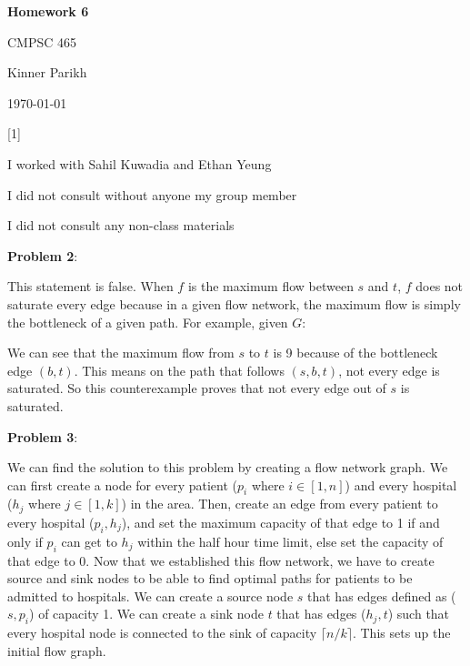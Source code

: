 \documentclass{article} %
\newcommand{\question}[2][]{\begin{flushleft}
        \textbf{Problem #1}: \textit{#2}

\end{flushleft}}
\newcommand{\maketitletwo}[2][]{\begin{center}
        \Large{\textbf{Homework #1}
            
            CMPSC 465} %
        \vspace{5pt}
        
        \normalsize{Kinner Parikh  %
        
        \today}        %
        \vspace{40pt}


        \newpage
        
\end{center}}
\begin{document}
    \maketitletwo[6]  %

    \question[1]{}
    \begin{center}
        
        I worked with Sahil Kuwadia and Ethan Yeung
    
        I did not consult without anyone my group member
    
        I did not consult any non-class materials
    \end{center}
    
    \newpage

    \question[2]{}

    This statement is false. When $f$ is the maximum flow between $s$ and $t$, $f$ does not saturate every edge because in a given flow network, the maximum flow is simply the bottleneck of a given path. For example, given $G$:


    We can see that the maximum flow from $s$ to $t$ is 9 because of the bottleneck edge $(b, t)$. This means on the path that follows $(s, b, t)$, not every edge is saturated. So this counterexample proves that not every edge out of $s$ is saturated.

    \newpage

    \question[3]{}

    We can find the solution to this problem by creating a flow network graph. We can first create a node for every patient ($p_i$ where $i \in [1,n]$) and every hospital ($h_j$ where $j \in [1,k]$) in the area. Then, create an edge from every patient to every hospital ($p_i, h_j$), and set the maximum capacity of that edge to 1 if and only if $p_i$ can get to $h_j$ within the half hour time limit, else set the capacity of that edge to 0. Now that we established this flow network, we have to create source and sink nodes to be able to find optimal paths for patients to be admitted to hospitals. We can create a source node $s$ that has edges defined as ($s, p_i$) of capacity 1. We can create a sink node $t$ that has edges ($h_j, t$) such that every hospital node is connected to the sink of capacity $\lceil n/k \rceil$. This sets up the initial flow graph.
\end{document}
